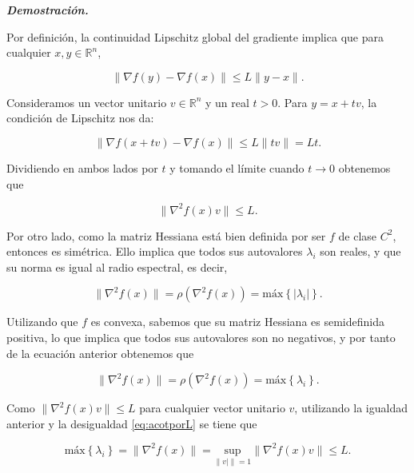 \vspace{1cm}
\begin{flushleft}
   \textbf{\textit{Demostración.}}
\end{flushleft} 

Por definición, la continuidad Lipschitz global del gradiente implica que para cualquier $x,y \in \mathbb{R}^n$,

\begin{equation*} 
	\| \nabla f(y) - \nabla f(x) \| \leq L \| y - x \|.
\end{equation*}

Consideramos un vector unitario $v \in \mathbb{R}^n$ y un real $t>0$. Para $y=x + tv$, la condición de Lipschitz nos da:

\begin{equation*} 
	\| \nabla f (x+tv) - \nabla f(x) \| \leq L \| tv\| = Lt.	
\end{equation*}

Dividiendo en ambos lados por $t$ y tomando el límite cuando $t \rightarrow 0$ obtenemos que

\begin{equation}\label{eq:acotporL}
	\| \nabla ^2 f(x) v \| \leq L.
\end{equation}

Por otro lado, como la matriz Hessiana está bien definida por ser $f$ de clase $C^2$, entonces es simétrica. Ello implica que todos sus autovalores $\lambda _i$ son reales, y que su norma es igual al radio espectral, es decir,

\begin{equation*}
	\| \nabla ^2 f(x) \| = \rho(\nabla ^2 f(x)) = \text{máx}\left \{ | \lambda_i | \right \}.
\end{equation*}

Utilizando que $f$ es convexa, sabemos que su matriz Hessiana es semidefinida positiva, lo que implica que todos sus autovalores son no negativos, y por tanto de la ecuación anterior obtenemos que 

\begin{equation*}
	\| \nabla ^2 f(x) \| = \rho(\nabla ^2 f(x)) = \text{máx}\left \{ \lambda_i \right \}.
\end{equation*}

Como $\| \nabla ^2 f(x) v \| \leq L$ para cualquier vector unitario $v$, utilizando la igualdad anterior y la desigualdad \eqref{eq:acotporL} se tiene que 

\begin{equation*}
	\text{máx}\left \{ \lambda_i \right \} = \| \nabla ^2 f(x) \| = \underset{\|v| \| =1}{\text{sup}} \| \nabla ^2 f(x) v \| \leq L.
\end{equation*}

